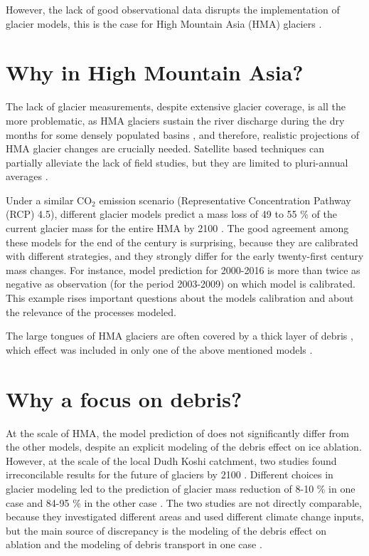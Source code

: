 However, the lack of good observational data disrupts the implementation of glacier models, this is the case for High Mountain Asia (HMA) glaciers \citep{bolch_state_2012,azam_review_2018}.

\section*{Why in High Mountain Asia?}
The lack of glacier measurements, despite extensive glacier coverage, is all the more problematic, as HMA glaciers sustain the river discharge during the dry months for some densely populated basins \citep{kaser_contribution_2010,immerzeel_climate_2010,schaner_contribution_2012,huss_toward_2017}, and therefore, realistic projections of HMA glacier changes are crucially needed. Satellite based techniques can partially alleviate the lack of field studies, but they are limited to pluri-annual averages \citep{kaab_contrasting_2012,gardelle_region-wide_2013}.


Under a similar CO$_2$ emission scenario (Representative Concentration Pathway (RCP) 4.5), different glacier models predict a mass loss of 49 to 55 \% of the current glacier mass for the entire HMA by 2100 \citep{marzeion_past_2012,radic_regional_2014,huss_new_2015,kraaijenbrink_impact_2017}.
The good agreement among these models for the end of the century is surprising, because they are calibrated with different strategies, and they strongly differ for the early twenty-first century mass changes. For instance, \citet{marzeion_past_2012} model prediction for 2000-2016 is more than twice as negative as \citet{gardner_reconciled_2013} observation (for the period 2003-2009) on which \citet{huss_new_2015} model is calibrated. This example rises important questions about the models calibration and about the relevance of the processes modeled.

The large tongues of HMA glaciers are often covered by a thick layer of debris \citep{scherler_spatially_2011}, which effect was included in only one of the above mentioned models \citep{kraaijenbrink_impact_2017}.

\section*{Why a focus on debris?}
At the scale of HMA, the model prediction of \citet{kraaijenbrink_impact_2017} does not significantly differ from the other models, despite an explicit modeling of the debris effect on ice ablation. However, at the scale of the local Dudh Koshi catchment, two studies found irreconcilable results for the future of glaciers by 2100 \citep{rowan_modelling_2015,shea_modelling_2015}. Different choices in glacier modeling led to the prediction of glacier mass reduction of 8-10 \% in one case \citep{rowan_modelling_2015} and 84-95 \% in the other case \citep{shea_modelling_2015}. The two studies are not directly comparable, because they investigated different areas and used different climate change inputs, but the main source of discrepancy is the modeling of the debris effect on ablation and the modeling of debris transport in one case \citep{rowan_modelling_2015}.

